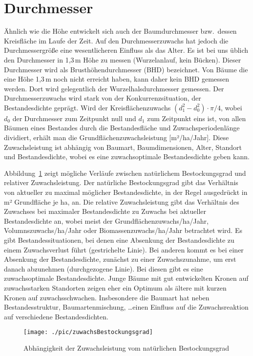 \documentclass[twocolumn]{scrartcl}
\begin{document}
\section{Durchmesser}

Ähnlich wie die Höhe entwickelt sich auch der Baumdurchmesser bzw.\ dessen
Kreisfläche im Laufe der Zeit. Auf den Durchmesserzuwachs hat jedoch die
Durchmessergröße eine wesentlicheren Einfluss als das Alter. Es ist bei uns
üblich den Durchmesser in 1,3\,m Höhe zu messen (Wurzelanlauf, kein Bücken).
Dieser Durchmesser wird als Brusthöhendurchmesser (BHD) bezeichnet. Von Bäume
die eine Höhe 1,3\,m noch nicht erreicht haben, kann daher kein BHD gemessen
werden. Dort wird gelegentlich der Wurzelhalsdurchmesser gemessen. Der
Durchmesserzuwachs wird stark von der Konkurrenzsituation, der Bestandesdichte
geprägt. Wird der Kreisflächenzuwachs $(d_1^2 - d_0^2)\cdot \pi/4$, wobei $d_0$
der Durchmesser zum Zeitpunkt null und $d_1$ zum Zeitpunkt eins ist, von allen
Bäumen eines Bestandes durch die Bestandesfläche und Zuwachsperiodenlänge
dividiert, erhält man die Grundflächenzuwachsleistung [m²/ha/Jahr]. Diese
Zuwachsleistung ist abhängig von Baumart, Baumdimensionen, Alter, Standort und
Bestandesdichte, wobei es eine zuwachsoptimale Bestandesdichte geben kann.

Abbildung~\ref{fig:zuwachsBestockungsgrad} zeigt mögliche Verläufe zwischen
natürlichem Bestockungsgrad und relativer Zuwachsleistung. Der natürliche
Bestockungsgrad gibt das Verhältnis von aktueller zu maximal möglicher
Bestandesdichte, in der Regel ausgedrückt in m² Grundfläche je ha, an. Die
relative Zuwachsleistung gibt das Verhältnis des Zuwachses bei maximaler
Bestandesdichte zu Zuwachs bei aktueller Bestandesdichte an, wobei meist der
Grundflächenzuwachs/ha/Jahr, Volumnszuwachs/ha/Jahr oder
Biomassenzuwachs/ha/Jahr betrachtet wird. Es gibt Bestandessituationen, bei
denen eine Absenkung der Bestandesdichte zu einem Zuwachsverlust führt
(gestrichelte Linie). Bei anderen kommt es bei einer Absenkung der
Bestandesdichte, zunächst zu einer Zuwachszunahme, um erst danach abzunehmen
(durchgezogene Linie). Bei diesen gibt es eine zuwachsoptimale Bestandesdichte.
Junge Bäume mit gut entwickelten Kronen auf zuwachsstarken Standorten zeigen
eher ein Optimum als ältere mit kurzen Kronen auf zuwachsschwachen. Insbesondere
die Baumart hat neben Bestandesstruktur, Baumartenmischung, \dots einen Einfluss
auf die Zuwachsreaktion auf verschiedene Bestandesdichten.

\begin{figure}[htbp]
  \centering
  \texttt{[image: ./pic/zuwachsBestockungsgrad]}
  \caption{Abhängigkeit der Zuwachsleistung vom natürlichen Bestockungsgrad}
  \label{fig:zuwachsBestockungsgrad}
\end{figure}
\end{document}
